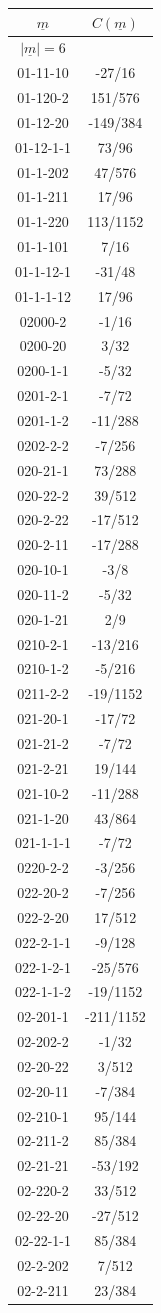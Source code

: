 \begin{tabular}[t]{|cc|}
\hline
$\underline{m}$ & $C(\underline{m})$\\
\hline\hline
$|\underline{m}|=6$&\\
\hline
01-11-10 &  -27/16\\
01-120-2 &  151/576\\
01-12-20 &  -149/384\\
01-12-1-1 &  73/96\\
01-1-202 &  47/576\\
01-1-211 &  17/96\\
01-1-220 &  113/1152\\
01-1-101 &  7/16\\
01-1-12-1 &  -31/48\\
01-1-1-12 &  17/96\\
02000-2 &  -1/16\\
0200-20 &  3/32\\
0200-1-1 &  -5/32\\
0201-2-1 &  -7/72\\
0201-1-2 &  -11/288\\
0202-2-2 &  -7/256\\
020-21-1 &  73/288\\
020-22-2 &  39/512\\
020-2-22 &  -17/512\\
020-2-11 &  -17/288\\
020-10-1 &  -3/8\\
020-11-2 &  -5/32\\
020-1-21 &  2/9\\
0210-2-1 &  -13/216\\
0210-1-2 &  -5/216\\
0211-2-2 &  -19/1152\\
021-20-1 &  -17/72\\
021-21-2 &  -7/72\\
021-2-21 &  19/144\\
021-10-2 &  -11/288\\
021-1-20 &  43/864\\
021-1-1-1 &  -7/72\\
0220-2-2 &  -3/256\\
022-20-2 &  -7/256\\
022-2-20 &  17/512\\
022-2-1-1 &  -9/128\\
022-1-2-1 &  -25/576\\
022-1-1-2 &  -19/1152\\
02-201-1 &  -211/1152\\
02-202-2 &  -1/32\\
02-20-22 &  3/512\\
02-20-11 &  -7/384\\
02-210-1 &  95/144\\
02-211-2 &  85/384\\
02-21-21 &  -53/192\\
02-220-2 &  33/512\\
02-22-20 &  -27/512\\
02-22-1-1 &  85/384\\
02-2-202 &  7/512\\
02-2-211 &  23/384\\
\hline
\end{tabular}
